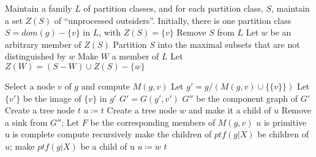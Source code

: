 \begin{algorithm}
    \begin{algorithmic}
            \State Maintain a family $L$ of partition classes, and for each partition class, $S$, maintain a set $Z(S)$ of ``unprocessed outsiders''.
            Initially, there is one partition class $S = dom(g) - \{v\}$ in $L$, with $Z(S) = \{v\}$
                \State Remove $S$ from $L$
                \State Let $w$ be an arbitrary member of $Z(S)$
                \State Partition $S$ into the maximal subsets that are not distinguished by $w$
                    \State Make $W$ a member of $L$
                    \State Let $Z(W) = (S - W) \cup Z(S) - \{w\}$
                \EndFor
            \EndWhile
        \EndFunction
    \end{algorithmic}\label{alg:compute-m}
\end{algorithm}

\begin{algorithm}
    \begin{algorithmic}
            \State Select a node $v$ of $g$ and compute $M(g, v)$
            \State Let $g' = g / (M(g, v) \cup \{\{v\}\})$
            \State Let $\{v'\}$ be the image of $\{v\}$ in $g'$
            \State $G' = G(g', v')$
            \State $G''$ be the component graph of $G'$
            \State Create a tree node $t$
            \State $u \coloneqq t$
                \State Create a tree node $w$ and make it a child of $u$
                \State Remove a sink from $G''$; Let $F$ be the corresponding members of $M(g, v)$
                    \State $u$ is primitive
                \Else
                    \State u is complete
                \EndIf
                    \State compute  recursively
                        \State make the children of $ptf(g|X)$ be children of $u$;
                    \ELSE
                        \State make $ptf(g|X)$ be a child of u
                    \EndIf
                \EndFor
                \State $u \coloneqq w$
            \EndWhile
            \Return $t$
        \EndFunction
    \end{algorithmic}\label{alg:prime-tree-family}
\end{algorithm}

